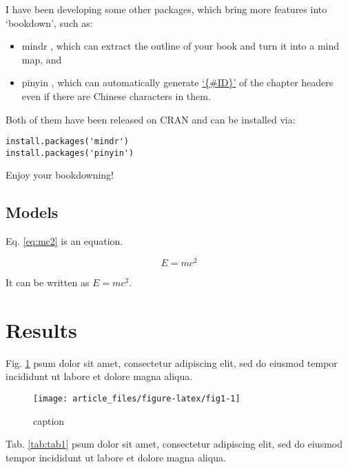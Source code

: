 \documentclass[bgd, online, hvmath]{style/copernicus}
\begin{document}
I have been developing some other packages, which bring more features
into `bookdown', such as:

\begin{itemize}
\item
  mindr \citep{R-mindr}, which can extract the outline of your book and
  turn it into a mind map, and
\item
  pinyin \citep{R-pinyin}, which can automatically generate
  \href{https://bookdown.org/yihui/bookdown/cross-references.html}{`\{\#ID\}'}
  of the chapter headers even if there are Chinese characters in them.
\end{itemize}

Both of them have been released on CRAN and can be installed via:

\begin{verbatim}
install.packages('mindr')
install.packages('pinyin')
\end{verbatim}

Enjoy your bookdowning!

\subsection{Models}\label{models}

Eq. \eqref{eq:mc2} is an equation.

\begin{equation} 
E = mc^2
  \label{eq:mc2}
\end{equation}

It can be written as \(E = mc^2\).

\section{Results}\label{results}

Fig. \ref{fig:fig1} psum dolor sit amet, consectetur adipiscing elit,
sed do eiusmod tempor incididunt ut labore et dolore magna aliqua.

\begin{figure}

{\centering \texttt{[image: article\_files/figure-latex/fig1-1]} 

}

\caption{caption}\label{fig:fig1}
\end{figure}

Tab. \ref{tab:tab1} psum dolor sit amet, consectetur adipiscing elit,
sed do eiusmod tempor incididunt ut labore et dolore magna aliqua.
\end{document}
